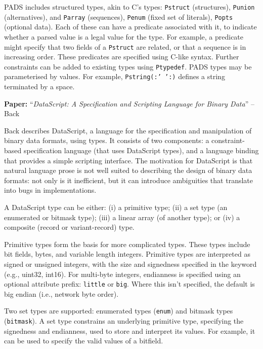 \documentclass[10pt,a4paper]{article}
\newcommand{\paper}[3]{\vspace{4mm}\noindent\textbf{Paper:} ``\textit{#1}'' -- #2 \cite{#3}\vspace{3mm}}
\begin{document}
PADS includes structured types, akin to C's types: \texttt{Pstruct} (structures),
\texttt{Punion} (alternatives), and \texttt{Parray} (sequences), \texttt{Penum} (fixed set
of literals), \texttt{Popts} (optional data). Each of these can have a predicate
associated with it, to indicate whether a parsed value is a legal value for the type. For
example, a predicate might specify that two fields of a \texttt{Pstruct} are related, or
that a sequence is in increasing order. These predicates are specified using C-like
syntax. Further constraints can be added to existing types using \texttt{Ptypedef}. PADS
types may be parameterised by values. For example, \texttt{Pstring(:' ':)} defines a
string terminated by a space. 

\paper{DataScript: A Specification and Scripting Language for Binary Data}{Back}{back2002datascript}

Back describes DataScript, a language for the specification and manipulation of binary
data formats, using types. It consists of two components: a constraint-based specification
language (that uses DataScript types), and a language binding that provides a simple
scripting interface. The motivation for DataScript is that natural language prose is not
well suited to describing the design of binary data formats: not only is it inefficient,
but it can introduce ambiguities that translate into bugs in implementations. 

A DataScript type can be either: (i) a primitive type; (ii) a set type (an enumerated
or bitmask type); (iii) a linear array (of another type); or (iv) a composite (record or
variant-record) type.

Primitive types form the basis for more complicated types. These types include bit fields,
bytes, and variable length integers. Primitive types are interpreted as signed or unsigned
integers, with the size and signedness specified in the keyword (e.g., uint32, int16). For 
multi-byte integers, endianness is specified using an optional attribute prefix:
\texttt{little} or \texttt{big}. Where this isn't specified, the default is big endian 
(i.e., network byte order).

Two set types are supported: enumerated types (\texttt{enum}) and bitmask types
(\texttt{bitmask}). A set type constrains an underlying primitive type, specifying the
signedness and endianness, used to store and interpret its values. For example, it can be
used to specify the valid values of a bitfield.
\end{document}

